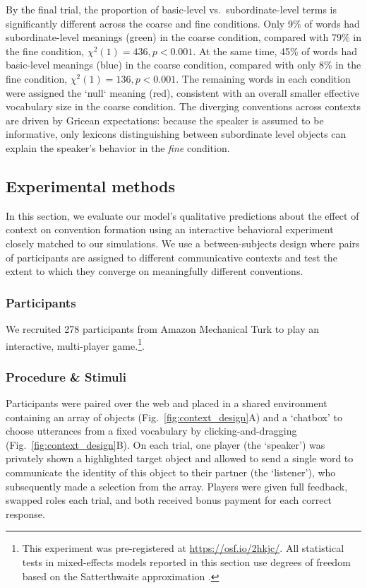 By the final trial, the proportion of basic-level vs.~subordinate-level terms is significantly different across the coarse and fine conditions.
Only 9\% of words had subordinate-level meanings (green) in the coarse condition, compared with 79\% in the fine condition, $\chi^2(1) = 436, p < 0.001$.
At the same time, 45\% of words had basic-level meanings (blue) in the coarse condition, compared with only 8\% in the fine condition, $\chi^2(1) = 136, p < 0.001$.
The remaining words in each condition were assigned the `null` meaning (red), consistent with an overall smaller effective vocabulary size in the coarse condition.
The diverging conventions across contexts are driven by Gricean expectations: because the speaker is assumed to be informative, only lexicons distinguishing between subordinate level objects can explain the speaker's behavior in the \emph{fine} condition.

\subsection{Experimental methods}

In this section, we evaluate our model's qualitative predictions about the effect of context on convention formation using an interactive behavioral experiment closely matched to our simulations.
We use a between-subjects design where pairs of participants are assigned to different communicative contexts and test the extent to which they converge on meaningfully different conventions.

\subsubsection{Participants}

We recruited 278 participants from Amazon Mechanical Turk to play an interactive, multi-player game.\footnote{This experiment was pre-registered at \url{https://osf.io/2hkjc/}. All statistical tests in mixed-effects models reported in this section use degrees of freedom based on the Satterthwaite approximation \cite{luke2017evaluating}.}.

\subsubsection{Procedure \& Stimuli}
Participants were paired over the web and placed in a shared environment containing an array of objects (Fig.~\ref{fig:context_design}A) and a `chatbox' to choose utterances from a fixed vocabulary by clicking-and-dragging (Fig.~\ref{fig:context_design}B). On each trial, one player (the `speaker') was privately shown a highlighted target object and allowed to send a single word to communicate the identity of this object to their partner (the `listener'), who subsequently made a selection from the array. Players were given full feedback, swapped roles each trial, and both received bonus payment for each correct response.

